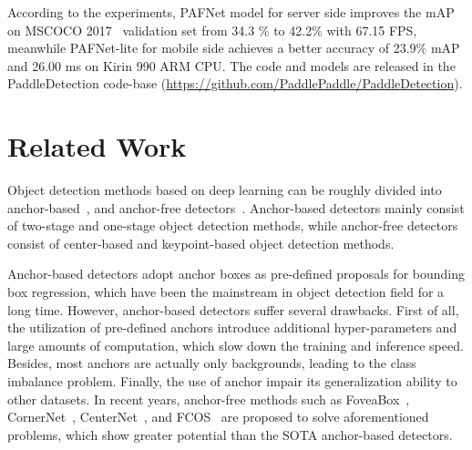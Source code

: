 \documentclass[10pt,twocolumn,letterpaper]{article}
\begin{document}
	According to the experiments, PAFNet model for server side improves the mAP on MSCOCO 2017~\cite{Lin2014MicrosoftCC} validation set from 34.3 \% to 42.2\% with 67.15 FPS, meanwhile PAFNet-lite for mobile side achieves a better accuracy of 23.9\% mAP and 26.00 ms on Kirin 990 ARM CPU. The code and models are released in the PaddleDetection code-base (\url{https://github.com/PaddlePaddle/PaddleDetection}).
	
\section{Related Work}
Object detection methods based on deep learning can be roughly divided into anchor-based~\cite{YOLO9000,SSD16,cascade18,iff}, and anchor-free detectors~\cite{kong1904foveabox,CornerNet2018,CenterNet2019,tian2019fcos,ttfnet2020}. Anchor-based detectors mainly consist of two-stage and one-stage object detection methods, while anchor-free detectors consist of center-based and keypoint-based object detection methods.
	






Anchor-based detectors adopt anchor boxes as pre-defined proposals for bounding box regression, which have been the mainstream in object detection field for a long time.
However, anchor-based detectors suffer several drawbacks. First of all, the utilization of pre-defined anchors introduce additional hyper-parameters and large amounts of computation, which slow down the training and inference speed. Besides, most anchors are actually only backgrounds, leading to the class imbalance problem. Finally, the use of anchor impair its generalization ability to other datasets.
In recent years, anchor-free methods such as FoveaBox~\cite{kong2019foveabox}, CornerNet~\cite{CornerNet2018}, CenterNet~\cite{CenterNet2019}, and FCOS~\cite{tian2019fcos} are proposed to solve aforementioned problems, which show greater potential than the SOTA anchor-based detectors.
    
\end{document}
